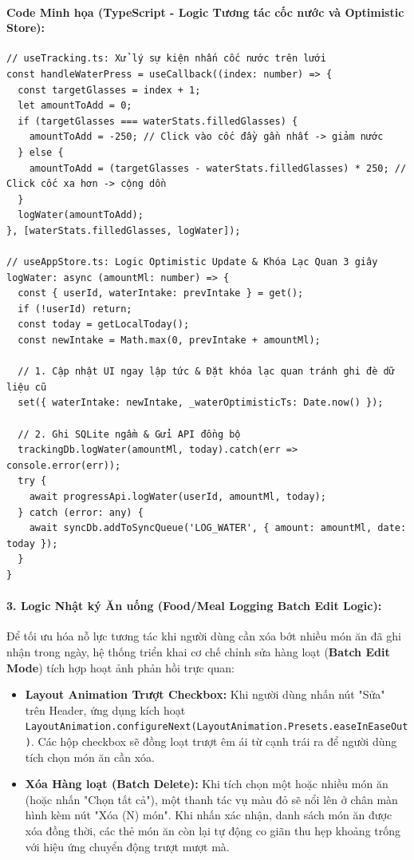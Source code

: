 \documentclass[12pt,a4paper]{article}
\begin{document}
\paragraph{Code Minh họa (TypeScript - Logic Tương tác cốc nước và Optimistic Store):}
\begin{verbatim}
// useTracking.ts: Xử lý sự kiện nhấn cốc nước trên lưới
const handleWaterPress = useCallback((index: number) => {
  const targetGlasses = index + 1;
  let amountToAdd = 0;
  if (targetGlasses === waterStats.filledGlasses) {
    amountToAdd = -250; // Click vào cốc đầy gần nhất -> giảm nước
  } else {
    amountToAdd = (targetGlasses - waterStats.filledGlasses) * 250; // Click cốc xa hơn -> cộng dồn
  }
  logWater(amountToAdd);
}, [waterStats.filledGlasses, logWater]);

// useAppStore.ts: Logic Optimistic Update & Khóa Lạc Quan 3 giây
logWater: async (amountMl: number) => {
  const { userId, waterIntake: prevIntake } = get();
  if (!userId) return;
  const today = getLocalToday();
  const newIntake = Math.max(0, prevIntake + amountMl);
  
  // 1. Cập nhật UI ngay lập tức & Đặt khóa lạc quan tránh ghi đè dữ liệu cũ
  set({ waterIntake: newIntake, _waterOptimisticTs: Date.now() });

  // 2. Ghi SQLite ngầm & Gửi API đồng bộ
  trackingDb.logWater(amountMl, today).catch(err => console.error(err));
  try {
    await progressApi.logWater(userId, amountMl, today);
  } catch (error: any) {
    await syncDb.addToSyncQueue('LOG_WATER', { amount: amountMl, date: today });
  }
}
\end{verbatim}

\paragraph{3. Logic Nhật ký Ăn uống (Food/Meal Logging Batch Edit Logic):}
Để tối ưu hóa nỗ lực tương tác khi người dùng cần xóa bớt nhiều món ăn đã ghi nhận trong ngày, hệ thống triển khai cơ chế chỉnh sửa hàng loạt (\textbf{Batch Edit Mode}) tích hợp hoạt ảnh phản hồi trực quan:
\begin{itemize}
    \item \textbf{Layout Animation Trượt Checkbox:} Khi người dùng nhấn nút "Sửa" trên Header, ứng dụng kích hoạt \texttt{LayoutAnimation.configureNext(LayoutAnimation.Presets.easeInEaseOut)}. Các hộp checkbox sẽ đồng loạt trượt êm ái từ cạnh trái ra để người dùng tích chọn món ăn cần xóa.
    \item \textbf{Xóa Hàng loạt (Batch Delete):} Khi tích chọn một hoặc nhiều món ăn (hoặc nhấn "Chọn tất cả"), một thanh tác vụ màu đỏ sẽ nổi lên ở chân màn hình kèm nút "Xóa (N) món". Khi nhấn xác nhận, danh sách món ăn được xóa đồng thời, các thẻ món ăn còn lại tự động co giãn thu hẹp khoảng trống với hiệu ứng chuyển động trượt mượt mà.
\end{itemize}
\end{document}

